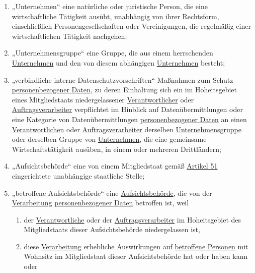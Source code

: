\begin{enumerate}
  \item „Unternehmen“ eine natürliche oder juristische Person, die eine wirtschaftliche Tätigkeit ausübt, unabhängig von
   ihrer Rechtsform, einschließlich Personengesellschaften oder Vereinigungen, die regelmäßig einer wirtschaftlichen
   Tätigkeit nachgehen;
  \label{itm:04-18}

  \item „Unternehmensgruppe“ eine Gruppe, die aus einem herrschenden \hyperref[itm:04-18]{Unternehmen} und den von
   diesem abhängigen
   \hyperref[itm:04-18]{Unternehmen} besteht;
  \label{itm:04-19}

  \item „verbindliche interne Datenschutzvorschriften“ Maßnahmen zum Schutz \hyperref[itm:04-1]
   {personenbezogener Daten}, zu deren Einhaltung sich ein im Hoheitsgebiet eines Mitgliedstaats
   niedergelassener \hyperref[itm:04-7]{Verantwortlicher} oder \hyperref[itm:04-8]{Auftragsverarbeiter} verpflichtet im
   Hinblick auf Datenübermittlungen oder eine Kategorie von Datenübermittlungen \hyperref[itm:04-1]
   {personenbezogener Daten} an einen \hyperref[itm:04-7]{Verantwortlichen} oder \hyperref[itm:04-8]
   {Auftragsverarbeiter} derselben \hyperref[itm:04-19]{Unternehmensgruppe} oder derselben Gruppe von
   \hyperref[itm:04-18]{Unternehmen}, die eine gemeinsame Wirtschaftstätigkeit ausüben, in einem oder mehreren
    Drittländern;
  \label{itm:04-20}

  \item „Aufsichtsbehörde“ eine von einem Mitgliedstaat gemäß \hyperref[ch:51]{Artikel 51} eingerichtete unabhängige
   staatliche Stelle;
  \label{itm:04-21}   

  \item „betroffene Aufsichtsbehörde“ eine \hyperref[itm:04-21]{Aufsichtsbehörde}, die von der \hyperref[itm:04-2]
   {Verarbeitung} \hyperref[itm:04-1]{personenbezogener Daten} betroffen ist, weil
  \label{itm:04-22}

  \begin{enumerate}

    \item der \hyperref[itm:04-7]{Verantwortliche} oder der \hyperref[itm:04-8]{Auftragsverarbeiter} im Hoheitsgebiet
     des Mitgliedstaats dieser Aufsichtsbehörde niedergelassen ist,
    \label{itm:04-22a}

    \item diese \hyperref[itm:04-2]{Verarbeitung} erhebliche Auswirkungen auf \hyperref[itm:04-1]{betroffene Personen}
     mit Wohnsitz im Mitgliedstaat dieser Aufsichtsbehörde hat oder haben kann oder
    \label{itm:04-22b}


\end{enumerate}
\end{enumerate}
